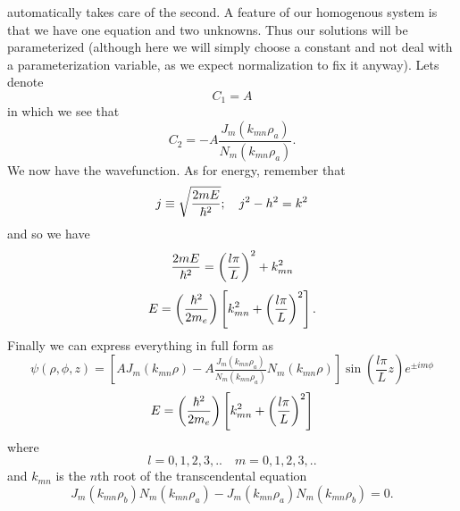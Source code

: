 \documentclass[11pt,letterpaper]{article}
\begin{document}
                automatically takes care of the second. A feature of our homogenous system is that we have one equation and two unknowns. Thus 
                our solutions will be parameterized (although here we will simply choose a constant and not deal with a parameterization variable, 
                as we expect normalization to fix it anyway). Lets denote
                \[
                		C_1 = A
		\]
                in which we see that
                \[
                		C_2 = -A\frac{J_m(k_{mn}\rho_a)}{N_m(k_{mn}\rho_a)}.
		\]
                We now have the wavefunction. As for energy, remember that
                \[
                		j\equiv\sqrt{\frac{2mE}{\hbar^2}};\quad j^2-h^2 = k^2
		\]
                and so we have
                \[
                		\frac{2mE}{\hbar^2} = \left(\frac{l\pi }{L}\right)^2+k_{mn}^2
		\]
                \[
                		 E = \left(\frac{\hbar^2}{2m_e}\right)\left[k_{mn}^2+\left(\frac{l\pi}{L}\right)^2\right].
		\]
                Finally we can express everything in full form as 
                \[
                		\psi(\rho,\phi,z) = \left[AJ_m(k_{mn}\rho)-A\tfrac{J_m(k_{mn}\rho_a)}{N_m(k_{mn}\rho_a)}N_m(k_{mn}\rho)\right]\sin\left(\frac{l	
			\pi}{L}z\right)e^{\pm im\phi}
		\]
                \[
                		E = \left(\frac{\hbar^2}{2m_e}\right)\left[k_{mn}^2+\left(\frac{l\pi}{L}\right)^2\right]
		\]
                where 
                \[
                		l=0,1,2,3,..\quad m=0,1,2,3,..
		\]
                and $k_{mn}$ is the $n$th root of the transcendental equation
                \[
                		J_m(k_{mn}\rho_b)N_m(k_{mn}\rho_a)-J_m(k_{mn}\rho_a)N_m(k_{mn}\rho_b) = 0.
		\]
                
\end{document}
